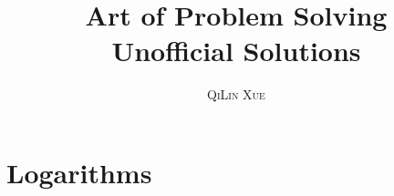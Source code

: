 \documentclass[a4paper,11pt,oneside]{book}
\title{\Huge \textbf{Art of Problem Solving} \\ \huge Unofficial Solutions}
\author{\textsc{QiLin Xue}}
\begin{document}
\maketitle
\tableofcontents


\chapter{Logarithms}



\end{document}
